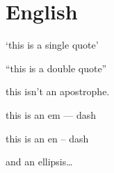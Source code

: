 
\def\mytitle{MultiMarkdown English Test}

\part{English}
\label{english}

`this is a single quote'

``this is a double quote''

this isn't an apostrophe.

this is an em --- dash

this is an en -- dash

and an ellipsis{\ldots}




